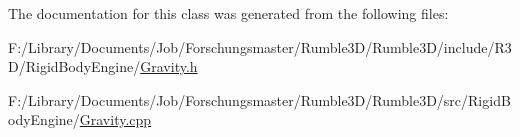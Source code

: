 The documentation for this class was generated from the following files\+:\begin{DoxyCompactItemize}
\item 
F\+:/\+Library/\+Documents/\+Job/\+Forschungsmaster/\+Rumble3\+D/\+Rumble3\+D/include/\+R3\+D/\+Rigid\+Body\+Engine/\hyperlink{_gravity_8h}{Gravity.\+h}\item 
F\+:/\+Library/\+Documents/\+Job/\+Forschungsmaster/\+Rumble3\+D/\+Rumble3\+D/src/\+Rigid\+Body\+Engine/\hyperlink{_gravity_8cpp}{Gravity.\+cpp}\end{DoxyCompactItemize}
